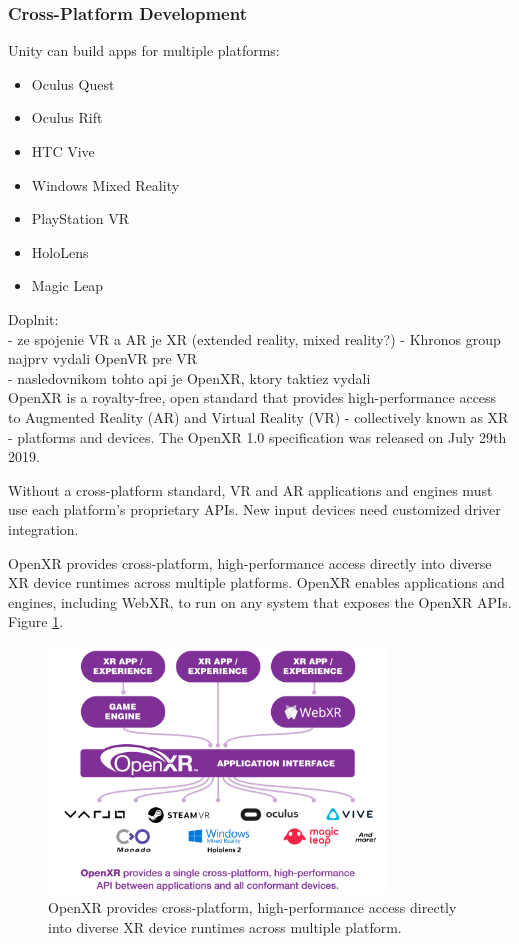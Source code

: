 \subsubsection{Cross-Platform Development}

Unity can build apps for multiple platforms:

\begin{itemize}
	\item Oculus Quest
	\item Oculus Rift
	\item HTC Vive
	\item Windows Mixed Reality
	\item PlayStation VR
	\item HoloLens
	\item Magic Leap
\end{itemize}

Doplnit:\\
- ze spojenie VR a AR je XR (extended reality, mixed reality?)
- Khronos group najprv vydali OpenVR pre VR \\
- nasledovnikom tohto api je OpenXR, ktory taktiez vydali \\

OpenXR is a royalty-free, open standard that provides high-performance access to Augmented Reality (AR) and Virtual Reality (VR) - collectively known as XR - platforms and devices.
The OpenXR 1.0 specification was released on July 29th 2019.

Without a cross-platform standard, VR and AR applications and engines must use each platform’s proprietary APIs. New input devices need customized driver integration.

OpenXR provides cross-platform, high-performance access directly into diverse XR device runtimes across multiple platforms. OpenXR enables applications and engines, including WebXR, to run on any system that exposes the OpenXR APIs. Figure \ref{fig:openxr-solves-fragmentation}.

\begin{figure}[!ht]
	\centering
	\includegraphics[width=0.8\textwidth]{figures/openxr-solves-fragmentation.png}
	\caption{OpenXR provides cross-platform, high-performance access directly into diverse XR device runtimes across multiple platform.}
	\label{fig:openxr-solves-fragmentation}
\end{figure}

